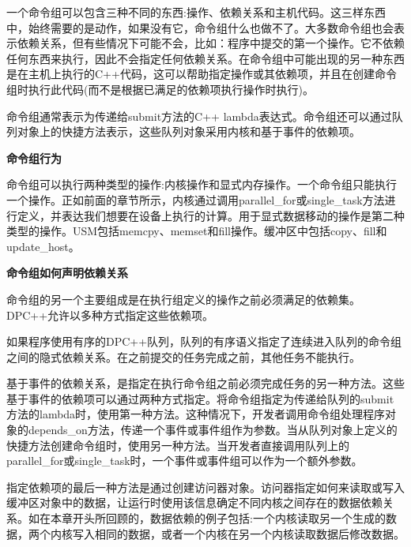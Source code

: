 一个命令组可以包含三种不同的东西:操作、依赖关系和主机代码。这三样东西中，始终需要的是动作，如果没有它，命令组什么也做不了。大多数命令组也会表示依赖关系，但有些情况下可能不会，比如：程序中提交的第一个操作。它不依赖任何东西来执行，因此不会指定任何依赖关系。在命令组中可能出现的另一种东西是在主机上执行的C++代码，这可以帮助指定操作或其依赖项，并且在创建命令组时执行此代码(而不是根据已满足的依赖项执行操作时执行)。\par

命令组通常表示为传递给submit方法的C++ lambda表达式。命令组还可以通过队列对象上的快捷方法表示，这些队列对象采用内核和基于事件的依赖项。\par

\hspace*{\fill} \par %
\textbf{命令组行为}

命令组可以执行两种类型的操作:内核操作和显式内存操作。一个命令组只能执行一个操作。正如前面的章节所示，内核通过调用parallel\_for或single\_task方法进行定义，并表达我们想要在设备上执行的计算。用于显式数据移动的操作是第二种类型的操作。USM包括memcpy、memset和fill操作。缓冲区中包括copy、fill和update\_host。\par

\hspace*{\fill} \par %
\textbf{命令组如何声明依赖关系}

命令组的另一个主要组成是在执行组定义的操作之前必须满足的依赖集。DPC++允许以多种方式指定这些依赖项。\par

如果程序使用有序的DPC++队列，队列的有序语义指定了连续进入队列的命令组之间的隐式依赖关系。在之前提交的任务完成之前，其他任务不能执行。\par

基于事件的依赖关系，是指定在执行命令组之前必须完成任务的另一种方法。这些基于事件的依赖项可以通过两种方式指定。将命令组指定为传递给队列的submit方法的lambda时，使用第一种方法。这种情况下，开发者调用命令组处理程序对象的depends\_on方法，传递一个事件或事件组作为参数。当从队列对象上定义的快捷方法创建命令组时，使用另一种方法。当开发者直接调用队列上的parallel\_for或single\_task时，一个事件或事件组可以作为一个额外参数。\par

指定依赖项的最后一种方法是通过创建访问器对象。访问器指定如何来读取或写入缓冲区对象中的数据，让运行时使用该信息确定不同内核之间存在的数据依赖关系。如在本章开头所回顾的，数据依赖的例子包括:一个内核读取另一个生成的数据，两个内核写入相同的数据，或者一个内核在另一个内核读取数据后修改数据。\par


